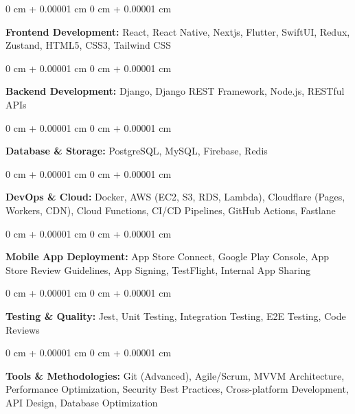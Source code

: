 \documentclass[10pt, letterpaper]{article}
\newenvironment{onecolentry}{
    \begin{adjustwidth}{
        0 cm + 0.00001 cm
    }{
        0 cm + 0.00001 cm
    }
}{
    \end{adjustwidth}
} %
\begin{document}
        \vspace{0.2 cm}

        \begin{onecolentry}
            \textbf{Frontend Development:} React, React Native, Nextjs, Flutter, SwiftUI, Redux, Zustand, HTML5, CSS3, Tailwind CSS
        \end{onecolentry}

        \vspace{0.2 cm}

        \begin{onecolentry}
            \textbf{Backend Development:} Django, Django REST Framework, Node.js, RESTful APIs
        \end{onecolentry}

        \vspace{0.2 cm}

        \begin{onecolentry}
            \textbf{Database \& Storage:} PostgreSQL, MySQL, Firebase, Redis
        \end{onecolentry}

        \vspace{0.2 cm}

        \begin{onecolentry}
            \textbf{DevOps \& Cloud:} Docker, AWS (EC2, S3, RDS, Lambda), Cloudflare (Pages, Workers, CDN), Cloud Functions, CI/CD Pipelines, GitHub Actions, Fastlane
        \end{onecolentry}

        \vspace{0.2 cm}

        \begin{onecolentry}
            \textbf{Mobile App Deployment:} App Store Connect, Google Play Console, App Store Review Guidelines, App Signing, TestFlight, Internal App Sharing
        \end{onecolentry}

        \vspace{0.2 cm}

        \begin{onecolentry}
            \textbf{Testing \& Quality:} Jest, Unit Testing, Integration Testing, E2E Testing, Code Reviews
        \end{onecolentry}

        \vspace{0.2 cm}

        \begin{onecolentry}
            \textbf{Tools \& Methodologies:} Git (Advanced), Agile/Scrum, MVVM Architecture, Performance Optimization, Security Best Practices, Cross-platform Development, API Design, Database Optimization
        \end{onecolentry}
\end{document}
